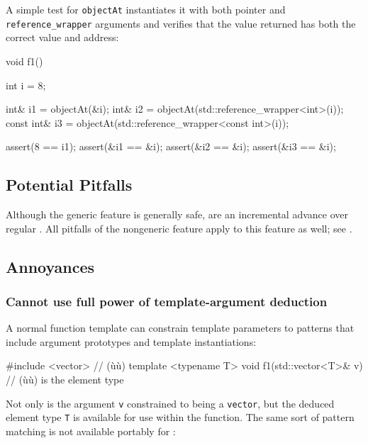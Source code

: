 {A simple test for \lstinline!objectAt! instantiates it with both pointer
and \lstinline!reference_wrapper! arguments and verifies that the value
returned has both the correct value and address:

\begin{emcppslisting}[emcppsbatch=e7]
void f1()
{
    int i = 8;

    int&       i1 = objectAt(&i);
    int&       i2 = objectAt(std::reference_wrapper<int>(i));
    const int& i3 = objectAt(std::reference_wrapper<const int>(i));

    assert(8 == i1);
    assert(&i1 == &i);
    assert(&i2 == &i);
    assert(&i3 == &i);
}
\end{emcppslisting}
    

\subsection[Potential Pitfalls]{Potential Pitfalls}\label{potential-pitfalls}

Although the generic feature is generally safe, 
are an incremental advance over regular . All
pitfalls of the nongeneric feature apply to this feature as well; see
.

\subsection[Annoyances]{Annoyances}\label{annoyances}

\subsubsection[Cannot use full power of template-argument deduction]{Cannot use full power of template-argument deduction}\label{cannot-use-full-power-of-template-argument-deduction}

A normal function template can constrain template parameters to patterns
that include argument prototypes and template instantiations:

\begin{emcppslisting}[emcppsbatch=e8,emcppsstandards={c++14}]
#include <vector>  // (ù{}ù)
template <typename T> void f1(std::vector<T>& v) { }  // (ù{}ù) is the element type
\end{emcppslisting}
    

\noindent Not only is the argument \lstinline!v! constrained to being a
\lstinline!vector!, but the deduced element type \lstinline!T! is available
for use within the function. The same sort of pattern matching is not
available portably for :

}
